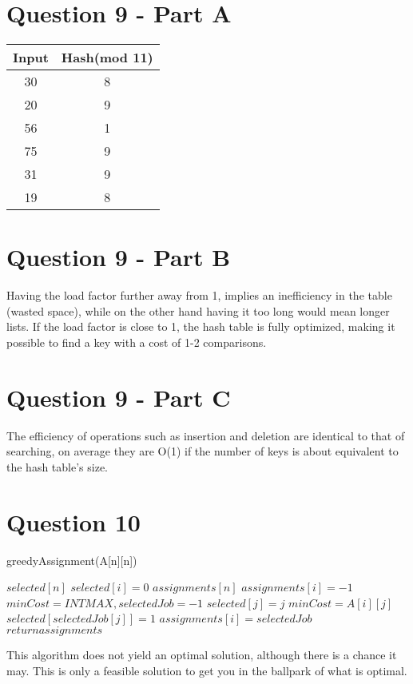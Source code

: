 \documentclass[11pt]{article} %
\begin{document}
\section {Question 9 - Part A}
\begin {center}
\begin {tabular}{||c c||}
	\hline
	Input & Hash(mod 11) \\
	\hline\hline
	30 & 8 \\ 
	\hline
	20 & 9\\ 
	\hline
	56 &  1\\
	\hline
	75 & 9\\
	\hline
	31 & 9 \\
	\hline
	19 & 8 \\
	\hline
\end {tabular}
\end {center}


\section {Question 9 - Part B}
	
	Having the load factor further away from 1, implies an inefficiency in the table (wasted space), while on the other hand having it too long would mean longer lists. If the load factor is close to 1, the hash table is fully optimized, making it possible to find a key with a cost of 1-2 comparisons.

\section {Question 9 - Part C}
	
	The efficiency of operations such as insertion and deletion are identical to that of searching, on average they are O(1) if the number of keys is about equivalent to the hash table’s size.

\section {Question 10}
\begin{algorithm}
\caption{greedyAssignment(A[n][n])}\label{alg:cap} 
\begin{algorithmic}

\State $selected[n]$
	\State $selected[i] = 0$
\EndFor
\State $assignments[n]$
	\State $assignments[i] = -1$
\EndFor
{}
  \State $minCost = INTMAX, selectedJob = -1$
    \State $selected[j]=j$
    \State $minCost=A[i][j]$
  \EndIf
  \State $selected[selectedJob[j]]=1$
  \State $assignments[i]=selectedJob$
  \EndFor
\EndFor
\State $return assignments$

This algorithm does not yield an optimal solution, although there is a chance it may. This is only a feasible solution to get you in the ballpark of what is optimal.

\end{algorithmic}
\end{algorithm}
\end{document}
